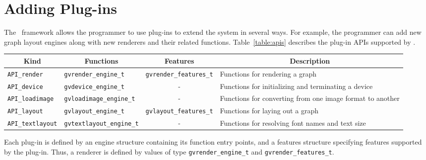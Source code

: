 \section{Adding Plug-ins}
\label{sec:pluginmain}

The \gviz\ framework allows the programmer to use plug-ins to
extend the system in several ways. For example, the programmer can add new
graph layout engines along with new renderers and their related
functions. Table~\ref{table:apis} describes the plug-in APIs
supported by \gviz.
\begin{table*}[htbp]\footnotesize
\centering
\begin{tabular}[t]{|l|l|c|p{2.0in}|} \hline
\multicolumn{1}{|c|}{Kind} & \multicolumn{1}{|c|}{Functions} & \multicolumn{1}{|c|}{Features} & \multicolumn{1}{c|}{Description} \\ \hline
{\tt API\_render} & {\tt gvrender\_engine\_t} & {\tt gvrender\_features\_t} & Functions for rendering a graph \\
{\tt API\_device} & {\tt gvdevice\_engine\_t} & - & Functions for initializing and terminating a device \\
{\tt API\_loadimage} & {\tt gvloadimage\_engine\_t} & - & Functions for converting from one image format to another \\
{\tt API\_layout} & {\tt gvlayout\_engine\_t} & {\tt gvlayout\_features\_t} & Functions for laying out a graph \\
{\tt API\_textlayout} & {\tt gvtextlayout\_engine\_t} & - & Functions for resolving font names and text size \\
\hline
\end{tabular}
\caption{Plug-in API types}
\label{table:apis}
\end{table*}
Each plug-in is defined by an engine structure containing its function
entry points, and a features structure specifying features supported
by the plug-in. Thus, a renderer is defined by values of type
{\tt gvrender\_engine\_t} and {\tt gvrender\_features\_t}.

